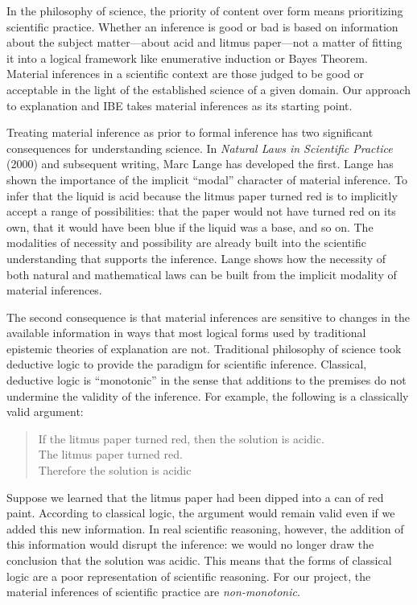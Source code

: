 \documentclass{article}[11pt]
\begin{document}
In the philosophy of science, the priority of content over form means prioritizing scientific practice.  Whether an inference is good or bad is based on information about the subject matter---about acid and litmus paper---not a matter of fitting it into a logical framework like enumerative induction or Bayes Theorem.  Material inferences in a scientific context are those judged to be good or acceptable in the light of the established science of a given domain.  Our approach to explanation and IBE takes material inferences as its starting point.

Treating material inference as prior to formal inference has two significant consequences for understanding science.  In \textit{Natural Laws in Scientific Practice} (2000) and subsequent writing, Marc Lange has developed the first.  Lange has shown the importance of the implicit ``modal'' character of material inference.  To infer that the liquid is acid because the litmus paper turned red is to implicitly accept a range of possibilities: that the paper would not have turned red on its own, that it would have been blue if the liquid was a base, and so on.  The modalities of necessity and possibility are already built into the scientific understanding that supports the inference.  Lange shows how the necessity of both natural and mathematical laws can be built from the implicit modality of material inferences. 

The second consequence is that material inferences are sensitive to changes in the available information in ways that most logical forms used by traditional epistemic theories of explanation are not.  Traditional philosophy of science took deductive logic to provide the paradigm for scientific inference.  Classical, deductive logic is ``monotonic'' in the  sense that additions to the premises do not undermine the validity of the inference.  For example, the following is a classically valid argument:

\begin{quote}
	If the litmus paper turned red, then the solution is acidic. \\[-6pt]
	The litmus paper turned red. \\[-6pt]
	Therefore the solution is acidic
\end{quote}

\noindent Suppose we learned that the litmus paper had been dipped into a can of red paint.  According to classical logic, the argument would remain valid even if we added this new information.  In real scientific reasoning, however, the addition of this information would disrupt the inference: we would no longer draw the conclusion that the solution was acidic.  This means that the forms of classical logic are a poor representation of scientific reasoning.  For our project, the material inferences of scientific practice are \textit{non-monotonic}.
\end{document}
